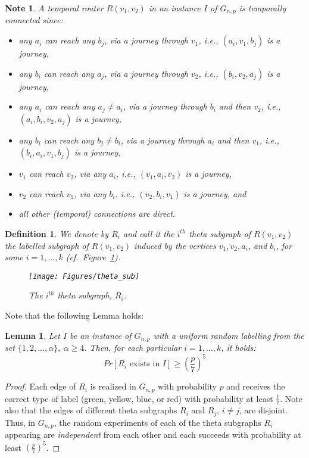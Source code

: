\documentclass[a4paper,UKenglish]{article}
\newtheorem{definition}{Definition}
\newtheorem{lemma}{Lemma}
\newtheorem*{note*}{Note}
\begin{document}
\begin{note*}
A temporal router $R(v_1,v_2)$ in an instance $I$ of $G_{n,p}$ is \emph{temporally connected} since:
\begin{itemize}
\item any $a_i$ can reach any $b_j$, via a journey through $v_1$, i.e., $(a_i,v_1,b_j)$ is a journey,
\item any $b_i$ can reach any $a_j$, via a journey through $v_2$, i.e., $(b_i,v_2,a_j)$ is a journey,
\item any $a_i$ can reach any $a_j\not= a_i$, via a journey through $b_i$ and then $v_2$, i.e., $(a_i,b_i,v_2,a_j)$ is a journey,
\item any $b_i$ can reach any $b_j\not= b_i$, via a journey through $a_i$ and then $v_1$, i.e., $(b_i,a_i,v_1,b_j)$ is a journey,
\item $v_1$ can reach $v_2$, via any $a_i$, i.e., $(v_1,a_i,v_2)$ is a journey,
\item $v_2$ can reach $v_1$, via any $b_i$, i.e., $(v_2,b_i,v_1)$ is a journey, and
\item all other (temporal) connections are direct.
\end{itemize}
\end{note*}

\begin{definition}
We denote by $R_i$ and call it the \emph{$i^{th}$ theta subgraph of $R(v_1,v_2)$} the labelled subgraph of $R(v_1,v_2)$ induced by the vertices $v_1,v_2,a_i$, and $b_i$, for some $i=1, \ldots, k$ (cf.~Figure~\ref{fig:theta_sub}).
\begin{figure}[!htb]
\centering
\texttt{[image: Figures/theta\_sub]}
\caption{The $i^{th}$ theta subgraph, $R_i$.}
\label{fig:theta_sub}
\end{figure}
\end{definition}

Note that the following Lemma holds:
\begin{lemma}\label{lem:rand_exp}
Let $I$ be an instance of $G_{n,p}$ with a uniform random labelling from the set $\{1,2,\ldots, \alpha\},~\alpha \geq 4$. Then, for each particular $i=1,\ldots, k$, it holds:
\[Pr[R_i \text{ exists in } I] \geq \left( \frac{p}{7} \right)^5\]
\end{lemma}
\begin{proof}
Each edge of $R_i$ is realized in $G_{n,p}$ with probability $p$ and receives the correct type of label (green, yellow, blue, or red) with probability at least $\frac{1}{7}$. Note also that the edges of different theta subgraphs $R_i$ and $R_j$, $i\not= j$, are disjoint. Thus, in $G_{n,p}$, the random experiments of each of the theta subgraphs $R_i$ appearing are \emph{independent} from each other and each succeeds with probability at least $\left( \frac{p}{7} \right)^5$.
\end{proof}
\end{document}
